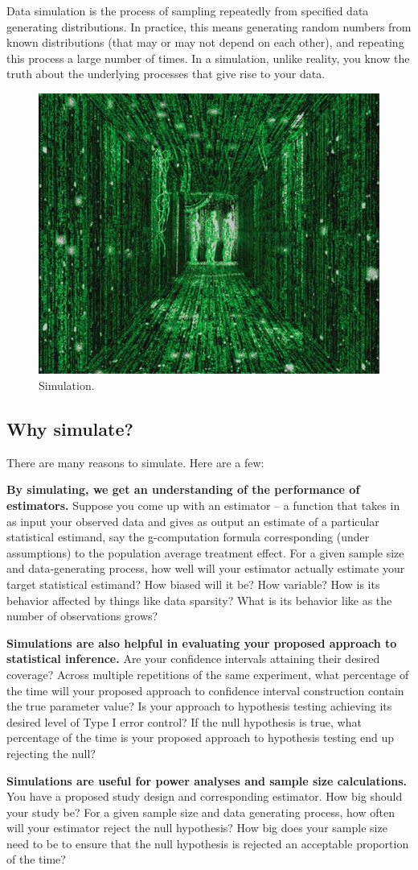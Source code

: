 \documentclass[answers]{exam}
\newenvironment{packed_enum}{
\begin{enumerate}
 \setlength{\itemsep}{0pt}
  \setlength{\parskip}{0pt}
  \setlength{\parsep}{0pt}
}{\end{enumerate}}
\begin{document}
Data simulation is the process of sampling repeatedly from specified data generating distributions. In practice, this means generating random numbers from known distributions (that may or may not depend on each other), and repeating this process a large number of times. In a simulation, unlike reality, you know the truth about the underlying processes that give rise to your data.

\begin{figure}
\begin{center}
\includegraphics[width=.4\textwidth]{matrixsim.jpg}
\caption{Simulation.}
\end{center}
\end{figure}

\subsection{Why simulate?}
There are many reasons to simulate. Here are a few:
\begin{packed_enum}
\item \textbf{By simulating, we get an understanding of the performance of estimators.} Suppose you come up with an estimator -- a function that takes in as input your observed data and gives as output an estimate of a particular statistical estimand, say the g-computation formula corresponding (under assumptions) to the population average treatment effect. For a given sample size and data-generating process, how well will your estimator actually estimate your target statistical estimand? How biased will it be? How variable? How is its behavior affected by things like data sparsity? What is its behavior like as the number of observations grows?  
\item \textbf{Simulations are also helpful in evaluating your proposed approach to statistical inference.} Are your confidence intervals attaining their desired coverage? Across multiple repetitions of the same experiment, what percentage of the time will your proposed approach to confidence interval construction contain the true parameter value? Is your approach to hypothesis testing achieving its desired level of Type I error control? If the null hypothesis is true, what percentage of the time is your proposed approach to hypothesis testing end up rejecting the null?
\item \textbf{Simulations are useful for power analyses and sample size calculations.} You have a proposed study design and corresponding estimator. How big should your study be? For a given sample size and data generating process, how often will your estimator reject the null hypothesis? How big does your sample size need to be to ensure that the null hypothesis is rejected an acceptable proportion of the time? 
\end{packed_enum}
\end{document}

